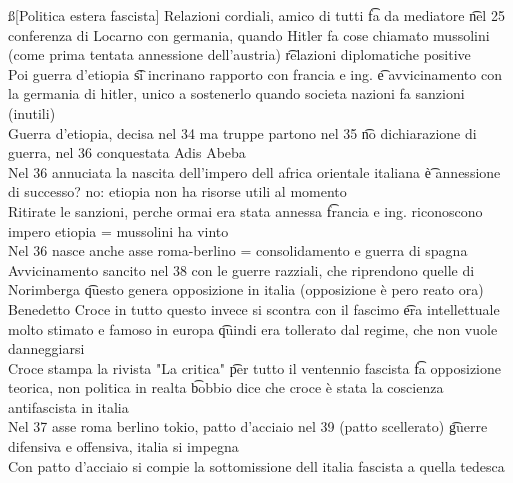 \documentclass[12pt]{article}
\begin{document}
\ss[Politica estera fascista]
Relazioni cordiali, amico di tutti \t fa da mediatore \t nel 25 conferenza di Locarno con germania, quando Hitler fa cose chiamato mussolini (come prima tentata annessione dell'austria) \t relazioni diplomatiche positive \\
Poi guerra d'etiopia \t si incrinano rapporto con francia e ing. \t e avvicinamento con la germania di hitler, unico a sostenerlo quando societa nazioni fa sanzioni (inutili) \\
Guerra d'etiopia, decisa nel 34 ma truppe partono nel 35 \t no dichiarazione di guerra, nel 36 conquestata Adis Abeba \\
Nel 36 annuciata la nascita dell'impero dell africa orientale italiana \t è annessione di successo? no: etiopia non ha risorse utili al momento \\
Ritirate le sanzioni, perche ormai era stata annessa \t francia e ing. riconoscono impero etiopia = mussolini ha vinto \\
Nel 36 nasce anche asse roma-berlino = consolidamento e guerra di spagna \\
Avvicinamento sancito nel 38 con le guerre razziali, che riprendono quelle di Norimberga \t questo genera opposizione in italia (opposizione è pero reato ora) \\
Benedetto Croce in tutto questo invece si scontra con il fascimo \t era intellettuale molto stimato e famoso in europa \t quindi era tollerato dal regime, che non vuole danneggiarsi \\
Croce stampa la rivista "La critica" \t per tutto il ventennio fascista \t fa opposizione teorica, non politica in realta \t bobbio dice che croce è stata la coscienza antifascista in italia \\
Nel 37 asse roma berlino tokio, patto d'acciaio nel 39 (patto scellerato) \t guerre difensiva e offensiva, italia si impegna \\
Con patto d'acciaio si compie la sottomissione dell italia fascista a quella tedesca
\end{document}

